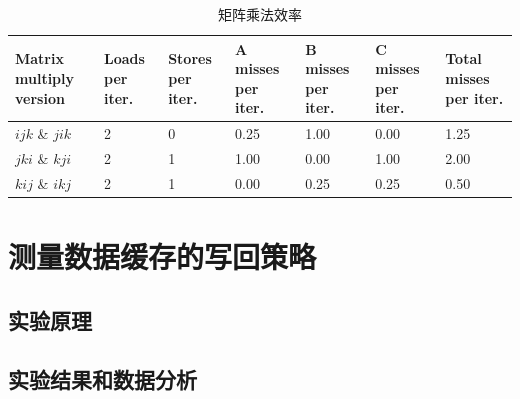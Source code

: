 \documentclass[adobefonts, nocap]{ctexart}
\begin{document}
    \begin{table}[htbp]
      \centering
      \begin{tabular}{p{1.5cm} p{1.5cm} p{1.5cm} p{1.5cm} p{1.5cm} p{1.5cm} p{1.5cm}}
        Matrix multiply version & Loads per iter. & Stores per iter. & A misses per iter. & B misses per iter. & C misses per iter. & Total misses per iter. \\
        \hline
        $ijk$ \& $jik$ & 2 & 0 & 0.25 & 1.00 & 0.00 & 1.25 \\
        $jki$ \& $kji$ & 2 & 1 & 1.00 & 0.00 & 1.00 & 2.00 \\
        $kij$ \& $ikj$ & 2 & 1 & 0.00 & 0.25 & 0.25 & 0.50 \\
      \end{tabular}
      \caption{矩阵乘法效率}
      \label{tab1}
    \end{table}
    \clearpage
  \section{测量数据缓存的写回策略}
    \subsection{实验原理}
    \subsection{实验结果和数据分析}
\end{document}
